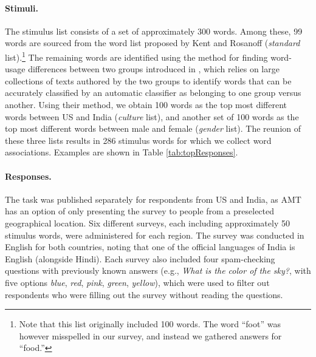 \documentclass[11pt,letterpaper]{article}
\newcommand{\FIXME}[1]{\textcolor{red}{#1}}
\begin{document}
\paragraph{Stimuli.} The stimulus list consists of a set of approximately 300 words. Among these,  99 words are sourced from the word list proposed by Kent and Rosanoff  (\textit{standard} list).\footnote{Note that this list originally included 100 words. The word ``foot'' was however misspelled in our survey, and instead we gathered answers for ``food.''}  The remaining words are identified using the method for finding word-usage differences between two groups introduced in \cite{Garimella16}, which relies on large collections of texts authored by the two groups to identify words that can be accurately classified by an automatic classifier as belonging to one group versus another. Using their method, we obtain 100 words as the top most different words between US and India (\textit{culture} list), and another set of 100 words as the top most different words between male and female (\textit{gender} list). 
The reunion of these three lists results in 286 stimulus words for which we collect word associations. Examples are shown in Table \ref{tab:topResponses}.

\paragraph{Responses.} The task was published separately for respondents from US and India, as AMT has an option of only presenting the survey to people from a preselected geographical location. Six different surveys, each including approximately 50 stimulus words, were administered for each region. The survey was conducted in English for both countries, noting that one of the official languages of India is English (alongside Hindi). Each survey also included four spam-checking questions with previously known answers (e.g., {\it What is the color of the sky?}, with five options {\it blue}, {\it red}, {\it pink}, {\it green}, {\it yellow}), which were used to filter out respondents who were filling out the survey without reading the questions. 
\end{document}
